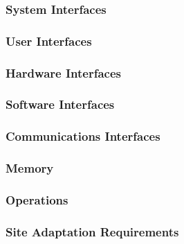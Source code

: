 \subsubsection{System Interfaces}
\subsubsection{User Interfaces}
\subsubsection{Hardware Interfaces}
\subsubsection{Software Interfaces}
\subsubsection{Communications Interfaces}
\subsubsection{Memory}
\subsubsection{Operations}
\subsubsection{Site Adaptation Requirements}
